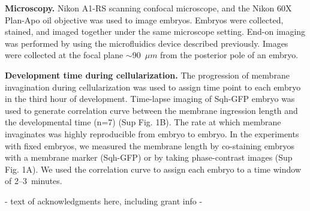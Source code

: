 \documentclass{pnastwo}
\begin{document}
\begin{article}
\begin{materials}
\textbf{Microscopy.}
%
Nikon A1-RS scanning confocal microscope, and the Nikon 60X Plan-Apo oil objective was used to image embryos. Embryos were collected, stained, and imaged together under the same microscope setting. End-on imaging was performed by using the microfluidics device described previously. Images were collected at the focal plane $\sim$90~$\mu m$ from the posterior pole of an embryo. 

\textbf{Development time during cellularization.} 
%
The progression of membrane invagination during cellularization was used to assign time point to each embryo in the third hour of development. Time-lapse imaging of Sqh-GFP embryo was used to generate correlation curve between the membrane ingression length and the developmental time (n=7) (Sup Fig. 1B). The rate at which membrane invaginates was highly reproducible from embryo to embryo. In the experiments with fixed embryos, we measured the membrane length by co-staining embryos with a membrane marker (Sqh-GFP) or by taking phase-contrast images (Sup Fig. 1A). We used the correlation curve to assign each embryo to a time window of 2--3~minutes. 

\end{materials}




\begin{acknowledgments}
- text of acknowledgments here, including grant info -
\end{acknowledgments}






\end{article}
\end{document}
